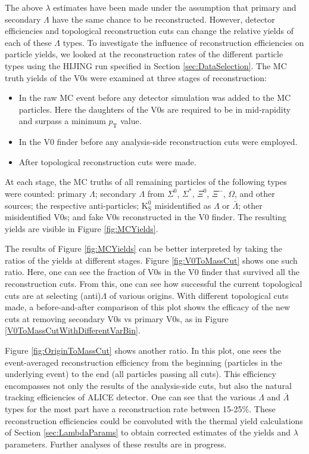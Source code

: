 The above $\lambda$ estimates have been made under the assumption that primary and secondary $\Lambda$ have the same chance to be reconstructed.  
However, detector efficiencies and topological reconstruction cuts can change the relative yields of each of these $\Lambda$ types.  
To investigate the influence of reconstruction efficiencies on particle yields, we looked at the reconstruction rates of the different particle types using the HIJING run specified in Section \ref{sec:DataSelection}.  
The MC truth yields of the V0s were examined at three stages of reconstruction:
\begin{itemize}
\item In the raw MC event before any detector simulation was added to the MC particles.  
Here the daughters of the V0s are required to be in mid-rapidity and surpass a minimum $p_\mathrm{T}$ value.
\item In the V0 finder before any analysis-side reconstruction cuts were employed.
\item After topological reconstruction cuts were made.
\end{itemize}
At each stage, the MC truths of all remaining particles of the following types were counted: primary $\Lambda$; secondary $\Lambda$ from $\Sigma^0$, $\Sigma^*$, $\Xi^0$, $\Xi^-$, $\Omega$, and other sources; the respective anti-particles; $\mathrm{K}^0_{\mathrm{S}}$ misidentified as $\Lambda$ or $\bar{\Lambda}$; other misidentified V0s; and fake V0s reconstructed in the V0 finder.  
The resulting yields are visible in Figure \ref{fig:MCYields}.

The results of Figure \ref{fig:MCYields} can be better interpreted by taking the ratios of the yields at different stages.  
Figure \ref{fig:V0ToMassCut} shows one such ratio.  Here, one can see the fraction of V0s in the V0 finder that survived all the reconstruction cuts.  
From this, one can see how successful the current topological cuts are at selecting (anti)$\Lambda$ of various origins.  
With different topological cuts made, a before-and-after comparison of this plot shows the efficacy of the new cuts at removing secondary V0s vs primary V0s, as in Figure \ref{V0ToMassCutWithDifferentVarBin}.

Figure \ref{fig:OriginToMassCut} shows another ratio.  
In this plot, one sees the event-averaged reconstruction efficiency from the beginning (particles in the underlying event) to the end (all particles passing all cuts).  
This efficiency encompasses not only the results of the analysis-side cuts, but also the natural tracking efficiencies of ALICE detector.  
One can see that the various $\Lambda$ and $\bar{\Lambda}$ types for the most part have a reconstruction rate between 15-25\%.  
These reconstruction efficiencies could be convoluted with the thermal yield calculations of Section \ref{sec:LambdaParams} to obtain corrected estimates of the yields and $\lambda$ parameters.  
Further analyses of these results are in progress.

